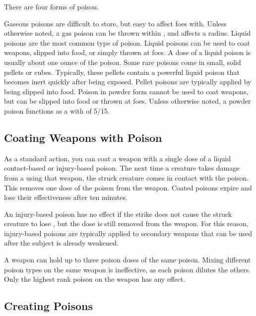         There are four forms of poison.

         Gaseous poisons are difficult to store, but easy to affect foes with.
        Unless otherwise noted, a gas poison can be thrown within \shortrange, and affects a \tinyarea radius.
         Liquid poisons are the most common type of poison.
        Liquid poisons can be used to coat weapons, slipped into food, or simply thrown at foes.
        A dose of a liquid poison is usually about one ounce of the poison.
         Some rare poisons come in small, solid pellets or cubes.
        Typically, these pellets contain a powerful liquid poison that becomes inert quickly after being exposed.
        Pellet poisons are typically applied by being slipped into food.
         Poison in powder form cannot be used to coat weapons, but can be slipped into food or thrown at foes.
        Unless otherwise noted, a powder poison functions as a  with  of 5/15.

    \subsection{Coating Weapons with Poison}\label{Coating Weapons with Poison}
        As a standard action, you can coat a weapon with a single dose of a liquid contact-based or injury-based poison.
        The next time a creature takes damage from a  using that weapon, the struck creature comes in contact with the poison.
        This removes one dose of the poison from the weapon.
        Coated poisons expire and lose their effectiveness after ten minutes.

        An injury-based poison has no effect if the strike does not cause the struck creature to lose , but the dose is still removed from the weapon.
        For this reason, injury-based poisons are typically applied to secondary weapons that can be used after the subject is already weakened.

        A weapon can hold up to three poison doses of the same poison.
        Mixing different poison types on the same weapon is ineffective, as each poison dilutes the others.
        Only the highest rank poison on the weapon has any effect.

    \subsection{Creating Poisons}\label{Creating Poisons}

